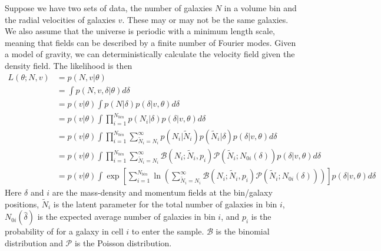 \documentclass{article}
\begin{document}
Suppose we have two sets of data, the number of galaxies $N$ in a volume
bin and the radial velocities of galaxies $v$.  These may or may not be the same galaxies.
We also assume that the universe is periodic with a minimum length scale, meaning that fields can be
described by a finite number of Fourier modes.  Given a model of gravity, we can deterministically calculate the
velocity field given the density field.
The likelihood is then
\begin{align}
L(\theta; N, v) & =p(N, v| \theta) \\
& = \int p(N,v,\delta | \theta) d\delta \\\
& = p(v|\theta)  \int p(N | \delta) p(\delta| v, \theta) d\delta \\
& = p(v|\theta)  \int \prod_{i=1}^{N_{bin}}  p(N_i | \delta) p(\delta| v, \theta) d\delta \\
& = p(v|\theta)  \int \prod_{i=1}^{N_{bin}}  \sum_{\tilde{N}_i =N_i}^\infty    p(N_i | \tilde{N}_i) p(\tilde{N}_i | \delta)  p(\delta| v, \theta) d\delta \\
& = p(v|\theta)  \int \prod_{i=1}^{N_{bin}}  \sum_{\tilde{N}_i =N_i}^\infty    \mathcal{B}(N_i; \tilde{N}_i, p_i) \mathcal{P}(\tilde{N}_i ; N_{0i}(\delta))  p(\delta| v, \theta) d\delta \\
& =  p(v|\theta)  \int  \exp \left[ \sum_{i=1}^{N_{bin}} \ln{  \left( \sum_{\tilde{N}_i =N_i}^\infty  \mathcal{B}(N_i; \tilde{N}_i, p_i) \mathcal{P}(\tilde{N}_i ; N_{0i}(\delta))\right)} \right]  p(\delta| v, \theta) d\delta 
\end{align}
Here $\delta$ and $i$ are  the mass-density  and momentum fields at the bin/galaxy positions, $\tilde{N}_i$ is the latent parameter
for the  total number of galaxies in bin $i$, $N_{0i}(\hat{\delta})$ is the expected
average number of galaxies in bin $i$, and $p_i$ is the probability of for a galaxy in cell $i$ to enter the sample.
$\mathcal{B}$ is the binomial distribution and $\mathcal{P}$ is the Poisson distribution.
\end{document}
